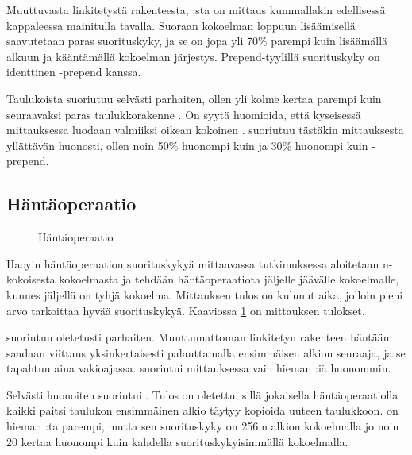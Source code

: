 Muuttuvasta linkitetystä rakenteesta, :sta on mittaus kummallakin edellisessä kappaleessa mainitulla tavalla. Suoraan kokoelman loppuun lisäämisellä saavutetaan paras suorituskyky, ja se on jopa yli 70\% parempi kuin lisäämällä alkuun ja kääntämällä kokoelman järjestys. Prepend-tyylillä suorituskyky on identtinen -prepend kanssa. 

Taulukoista  suoriutuu selvästi parhaiten, ollen yli kolme kertaa parempi kuin seuraavaksi paras taulukkorakenne . On syytä huomioida, että kyseisessä mittauksessa luodaan valmiiksi oikean kokoinen .  suoriutuu tästäkin mittauksesta yllättävän huonosti, ollen noin 50\% huonompi kuin  ja 30\% huonompi kuin -prepend.


\subsection{Häntäoperaatio}

\begin{figure}[h]
    \centering
    
    \caption{Häntäoperaatio}\label{hantaoperaatio_kaavio}
\end{figure}

Haoyin häntäoperaation suorituskykyä mittaavassa tutkimuksessa aloitetaan n-kokoisesta kokoelmasta ja tehdään häntäoperaatiota jäljelle jäävälle kokoelmalle, kunnes jäljellä on tyhjä kokoelma. Mittauksen tulos on kulunut aika, jolloin pieni arvo tarkoittaa hyvää suorituskykyä. Kaaviossa \ref{hantaoperaatio_kaavio} on mittauksen tulokset.

 suoriutuu oletetusti parhaiten. Muuttumattoman linkitetyn rakenteen häntään saadaan viittaus yksinkertaisesti palauttamalla ensimmäisen alkion seuraaja, ja se tapahtuu aina vakioajassa.  suoriutui mittauksessa vain hieman :iä huonommin. 

Selvästi huonoiten suoriutui . Tulos on oletettu, sillä jokaisella häntäoperaatiolla kaikki paitsi taulukon ensimmäinen alkio täytyy kopioida uuteen taulukkoon.  on hieman :ta parempi, mutta sen suorituskyky on 256:n alkion kokoelmalla jo noin 20 kertaa huonompi kuin kahdella suorituskykyisimmällä kokoelmalla.
